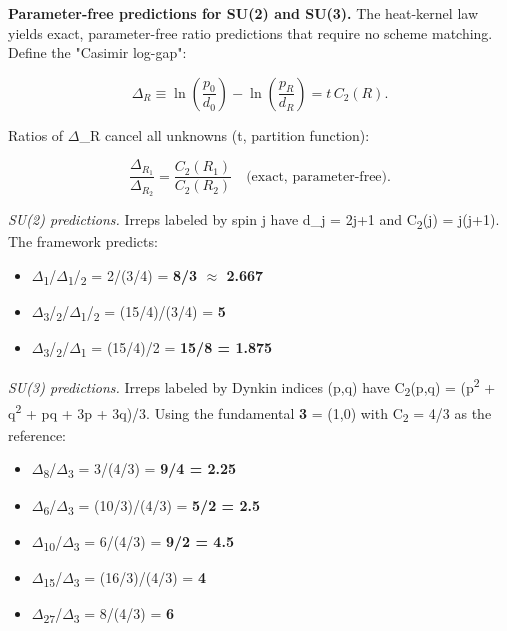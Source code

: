 \textbf{Parameter-free predictions for SU(2) and SU(3).} The heat-kernel law yields exact, parameter-free ratio predictions that require no scheme matching. Define the "Casimir log-gap":

\[
\Delta_R \equiv \ln\left(\frac{p_0}{d_0}\right) - \ln\left(\frac{p_R}{d_R}\right)
= t \, C_2(R).
\]

Ratios of \ensuremath{\Delta}\_R cancel all unknowns (t, partition function):

\[
\frac{\Delta_{R_1}}{\Delta_{R_2}} = \frac{C_2(R_1)}{C_2(R_2)}
\quad \text{(exact, parameter-free).}
\]

\emph{SU(2) predictions.} Irreps labeled by spin j have d\_j = 2j+1 and C\textsubscript{2}(j) = j(j+1). The framework predicts:

\begin{itemize}
\tightlist
\item
  \ensuremath{\Delta}\textsubscript{1}/\ensuremath{\Delta}\textsubscript{1}/\textsubscript{2} = 2/(3/4) = \textbf{8/3 \ensuremath{\approx} 2.667}
\item
  \ensuremath{\Delta}\textsubscript{3}/\textsubscript{2}/\ensuremath{\Delta}\textsubscript{1}/\textsubscript{2} = (15/4)/(3/4) = \textbf{5}
\item
  \ensuremath{\Delta}\textsubscript{3}/\textsubscript{2}/\ensuremath{\Delta}\textsubscript{1} = (15/4)/2 = \textbf{15/8 = 1.875}
\end{itemize}

\emph{SU(3) predictions.} Irreps labeled by Dynkin indices (p,q) have C\textsubscript{2}(p,q) = (p\textsuperscript{2} + q\textsuperscript{2} + pq + 3p + 3q)/3. Using the fundamental \textbf{3} = (1,0) with C\textsubscript{2} = 4/3 as the reference:

\begin{itemize}
\tightlist
\item
  \ensuremath{\Delta}\textsubscript{8}/\ensuremath{\Delta}\textsubscript{3} = 3/(4/3) = \textbf{9/4 = 2.25}
\item
  \ensuremath{\Delta}\textsubscript{6}/\ensuremath{\Delta}\textsubscript{3} = (10/3)/(4/3) = \textbf{5/2 = 2.5}
\item
  \ensuremath{\Delta}\textsubscript{1}\textsubscript{0}/\ensuremath{\Delta}\textsubscript{3} = 6/(4/3) = \textbf{9/2 = 4.5}
\item
  \ensuremath{\Delta}\textsubscript{1}\textsubscript{5}/\ensuremath{\Delta}\textsubscript{3} = (16/3)/(4/3) = \textbf{4}
\item
  \ensuremath{\Delta}\textsubscript{2}\textsubscript{7}/\ensuremath{\Delta}\textsubscript{3} = 8/(4/3) = \textbf{6}
\end{itemize}


